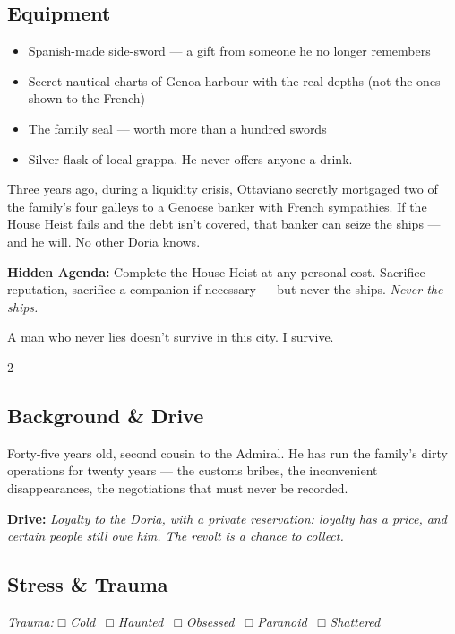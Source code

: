 \subsection*{Equipment}
\begin{itemize}
  \item Spanish-made side-sword --- a gift from someone he no longer remembers
  \item Secret nautical charts of Genoa harbour with the real depths (not the ones shown to the French)
  \item The family seal --- worth more than a hundred swords
  \item Silver flask of local grappa. He never offers anyone a drink.
\end{itemize}

\begin{secretbox}
Three years ago, during a liquidity crisis, Ottaviano secretly mortgaged
two of the family's four galleys to a Genoese banker with French sympathies.
If the House Heist fails and the debt isn't covered, that banker can seize
the ships --- and he will. No other Doria knows.

\medskip
\textbf{\textcolor{SecretRed}{Hidden Agenda:}} Complete the House Heist at any personal cost.
Sacrifice reputation, sacrifice a companion if necessary --- but never the ships.
\textit{Never the ships.}
\end{secretbox}

\newpage


%
  {A man who never lies doesn't survive in this city. I survive.}

\begin{multicols}{2}
\subsection*{Background \& Drive}
Forty-five years old, second cousin to the Admiral. He has run the family's
dirty operations for twenty years --- the customs bribes, the inconvenient
disappearances, the negotiations that must never be recorded.

\textbf{\textcolor{DoriaBlue}{Drive:}} \textit{Loyalty to the Doria, with
a private reservation: loyalty has a price, and certain people still owe
him. The revolt is a chance to collect.}
\columnbreak
\subsection*{Stress \& Trauma}
\textit{\small Trauma: □ Cold \ □ Haunted \ □ Obsessed \ □ Paranoid \ □ Shattered}
\end{multicols}

